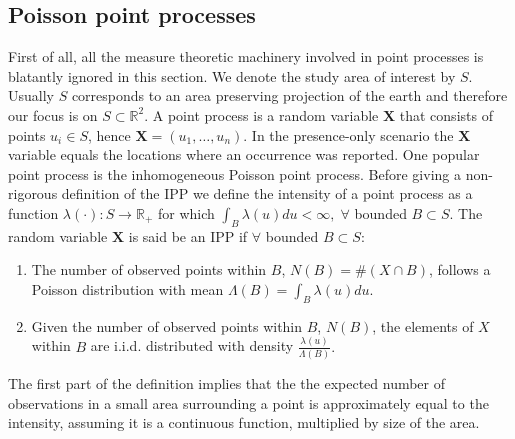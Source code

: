 \subsection{Poisson point processes}
\label{sec:IPP}
First of all, all the measure theoretic machinery involved in point processes is blatantly ignored in this section. We denote the study area of interest by $S$. Usually $S$ corresponds to an area preserving projection of the earth and therefore our focus is on $S\subset \mathbb{R}^2$. A point process is a random variable $\bm{X}$ that consists of points $u_i \in S$, hence $\bm{X} =  (u_1,\ldots,u_n)$. In the presence-only scenario the $\bm{X}$ variable equals the locations where an occurrence was reported. One popular point process is the inhomogeneous Poisson point process. Before giving a non-rigorous definition of the IPP we define the intensity of a point process as a function $\lambda(\cdot): S \to \mathbb{R}_+$ for which $\int_B \lambda(u)du < \infty,\; \forall$ bounded $B \subset S$. The random variable $\bm{X}$ is said be an IPP if $\forall$ bounded $ B \subset S$:
\begin{enumerate}
\item The number of observed points within $B$, $N(B) = \# (X \cap B)$, follows a Poisson distribution with mean $\Lambda(B) = \int_B \lambda(u)du.$
\item Given the number of observed points within $B$, $N(B)$, the elements of $X$ within $B$ are i.i.d. distributed with density $\frac{\lambda(u)}{\Lambda(B)}.$
\end{enumerate}
The first part of the definition implies that the the expected number of observations in a small area surrounding a point is approximately equal to the intensity, assuming it is a continuous function, multiplied by size of the area. \\

